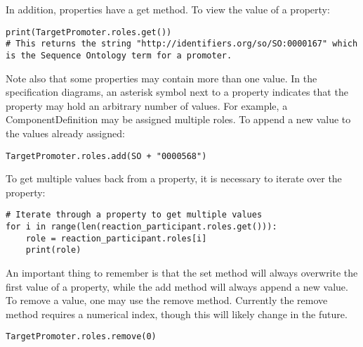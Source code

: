 In addition, properties have a get method. To view the value of a property:

\vspace{\abovedisplayskip}
\begin{minipage}{0.95\textwidth} 
\begin{lstlisting}
print(TargetPromoter.roles.get())
# This returns the string "http://identifiers.org/so/SO:0000167" which is the Sequence Ontology term for a promoter.
\end{lstlisting}
\end{minipage}

Note also that some properties may contain more than one value. In the specification diagrams, an asterisk symbol next to a property indicates that the property may hold an arbitrary number of values. For example, a ComponentDefinition may be assigned multiple roles. To append a new value to the values already assigned:

\vspace{\abovedisplayskip}
\begin{minipage}{0.95\textwidth} 
\begin{lstlisting}
TargetPromoter.roles.add(SO + "0000568")
\end{lstlisting}
\end{minipage}

To get multiple values back from a property, it is necessary to iterate over the property:

\vspace{\abovedisplayskip}
\begin{minipage}{0.95\textwidth} 
\begin{lstlisting}
# Iterate through a property to get multiple values
for i in range(len(reaction_participant.roles.get())):
    role = reaction_participant.roles[i]
    print(role)
\end{lstlisting}
\end{minipage}

An important thing to remember is that the set method will always overwrite the first value of a property, while the add method will always append a new value. To remove a value, one may use the remove method. Currently the remove method requires a numerical index, though this will likely change in the future.

\vspace{\abovedisplayskip}
\begin{minipage}{0.95\textwidth} 
\begin{lstlisting}
TargetPromoter.roles.remove(0)
\end{lstlisting}
\end{minipage}

